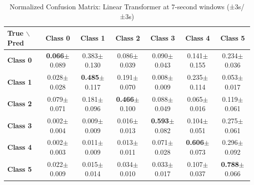 \begin{table}[htbp]
\centering
\caption{Normalized Confusion Matrix: Linear Transformer at 7-second windows (±3s/±3s)}
\label{tab:app_cm_linear_7s}
\small
\setlength{\tabcolsep}{2pt}
\begin{tabular}{lcccccc}
	\toprule
	\textbf{True $\backslash$ Pred} & \textbf{Class 0} & \textbf{Class 1} & \textbf{Class 2} & \textbf{Class 3} & \textbf{Class 4} & \textbf{Class 5} \\
\midrule
	\textbf{Class 0} & \textbf{0.066}$\pm$0.089 & 0.383$\pm$0.130 & 0.086$\pm$0.039 & 0.090$\pm$0.043 & 0.141$\pm$0.155 & 0.234$\pm$0.036 \\
	\textbf{Class 1} & 0.028$\pm$0.028 & \textbf{0.485}$\pm$0.117 & 0.191$\pm$0.070 & 0.008$\pm$0.009 & 0.235$\pm$0.114 & 0.053$\pm$0.017 \\
	\textbf{Class 2} & 0.079$\pm$0.071 & 0.181$\pm$0.096 & \textbf{0.466}$\pm$0.100 & 0.088$\pm$0.049 & 0.065$\pm$0.016 & 0.119$\pm$0.061 \\
	\textbf{Class 3} & 0.002$\pm$0.004 & 0.009$\pm$0.009 & 0.016$\pm$0.013 & \textbf{0.593}$\pm$0.082 & 0.104$\pm$0.051 & 0.275$\pm$0.061 \\
	\textbf{Class 4} & 0.002$\pm$0.003 & 0.011$\pm$0.009 & 0.013$\pm$0.011 & 0.071$\pm$0.028 & \textbf{0.606}$\pm$0.073 & 0.296$\pm$0.092 \\
	\textbf{Class 5} & 0.022$\pm$0.009 & 0.015$\pm$0.014 & 0.034$\pm$0.010 & 0.033$\pm$0.017 & 0.107$\pm$0.037 & \textbf{0.788}$\pm$0.066 \\
\bottomrule
\end{tabular}
\setlength{\tabcolsep}{6pt}
\end{table}

